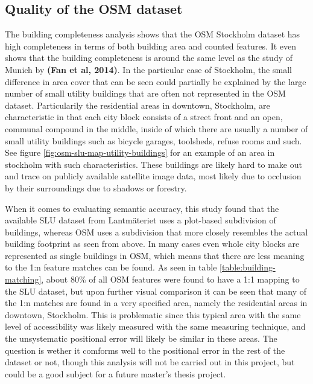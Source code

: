 \documentclass{kththesis}
\begin{document}
\subsection{Quality of the OSM dataset}

The building completeness analysis shows that the OSM Stockholm dataset has high completeness in terms of both building area and counted features. It even shows that the building completeness is around the same level as the study of Munich by \textbf{(Fan et al, 2014)}.
In the particular case of Stockholm, the small difference in area cover that can be seen could partially be explained by the large number of small utility buildings that are often not represented in the OSM dataset.
Particularily the residential areas in downtown, Stockholm, are characteristic in that each city block consists of a street front and an open, communal compound in the middle, inside of which there are usually a number of small utility buildings such as bicycle garages, toolsheds, refuse rooms and such.
See figure \ref{fig:osm-slu-map-utility-buildings} for an example of an area in stockholm with such characteristics.
These buildings are likely hard to make out and trace on publicly available satellite image data, most likely due to occlusion by their surroundings due to shadows or forestry.

When it comes to evaluating semantic accuracy, this study found that the available SLU dataset from Lantmäteriet uses a plot-based subdivision of buildings, whereas OSM uses a subdivision that more closely resembles the actual building footprint as seen from above.
In many cases even whole city blocks are represented as single buildings in OSM, which means that there are less meaning to the 1:n feature matches can be found.
As seen in table \ref{table:building-matching}, about 80\% of all OSM features were found to have a 1:1 mapping to the SLU dataset, but upon further visual comparison it can be seen that many of the 1:n matches are found in a very specified area, namely the residential areas in downtown, Stockholm.
This is problematic since this typical area with the same level of accessibility was likely measured with the same measuring technique, and the unsystematic positional error will likely be similar in these areas.
The question is wether it comforms well to the positional error in the rest of the dataset or not, though this analysis will not be carried out in this project, but could be a good subject for a future master's thesis project.
\end{document}

